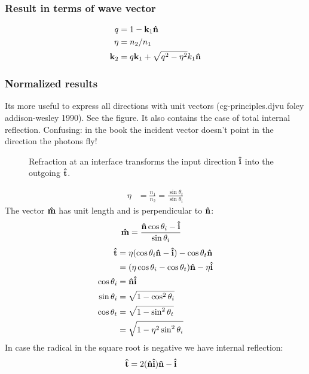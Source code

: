 \documentclass[twocolumn,DIV19]{scrartcl}
\begin{document}
\subsubsection{Result in terms of wave vector}
\begin{align}
  q &= 1-\mathbf{k}_1 \mathbf{\hat{n}}\\
  \eta &= n_2/n_1\\
  \mathbf{k}_2 &= q \mathbf{k}_1 + \sqrt{q^2-\eta^2} k_1\mathbf{\hat{n}}
\end{align}
\subsubsection{Normalized results}
Its more useful to express all directions with unit vectors
(cg-principles.djvu foley addison-wesley 1990). See the figure.  It
also contains the case of total internal reflection.  Confusing: in
the book the incident vector doesn't point in the direction the
photons fly!

 \begin{figure}
   \centering
   
   \caption{Refraction at an interface transforms the input direction
     $\mathbf{\hat{i}}$ into the outgoing $\mathbf{\hat{t}}$.}
 \end{figure}
 \begin{align}
   \eta&=\frac{n_1}{n_2}=\frac{\sin\theta_t}{\sin\theta_i}
 \end{align}
 The vector $\mathbf{\hat{m}}$ has unit length and is perpendicular to $\mathbf{\hat{n}}$:
 \begin{align}
   \mathbf{\hat{m}}&=\frac{\mathbf{\hat{n}}\cos\theta_i - \mathbf{\hat{i}}}{\sin\theta_i}
 \end{align}
 \begin{align}
   \mathbf{\hat{t}}&=\eta(\cos\theta_i\mathbf{\hat{n}}-\mathbf{\hat{i}})-\cos\theta_t\mathbf{\hat{n}}\\
   &=(\eta\cos\theta_i-\cos\theta_t)\mathbf{\hat{n}}-\eta\mathbf{\hat{i}}\\
   \cos\theta_i&=\mathbf{\hat{n}}\mathbf{\hat{i}}\\
   \sin\theta_i&=\sqrt{1-\cos^2\theta_i}\\
   \cos\theta_t&=\sqrt{1-\sin^2\theta_t}\\
   &=\sqrt{1-\eta^2\sin^2\theta_i}
 \end{align}
 In case the radical in the square root is negative we have internal reflection:
 \begin{align}
   \mathbf{\hat{t}}&=2(\mathbf{\hat{n}}\mathbf{\hat{i}})\mathbf{\hat{n}}-\mathbf{\hat{i}}
 \end{align}
\end{document}

